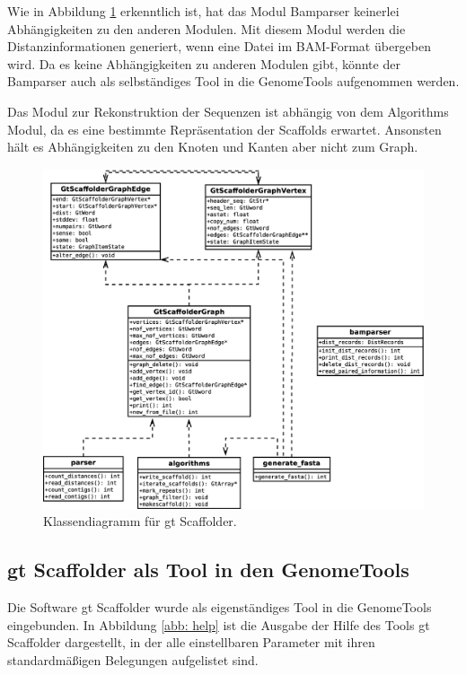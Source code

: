 \documentclass[a4paper,11pt,parskip,abstract=on]{scrartcl}
\begin{document}
Wie in Abbildung \ref{abb: UML} erkenntlich ist, hat das Modul
Bamparser keinerlei Abhängigkeiten zu den anderen Modulen. Mit diesem
Modul werden die Distanzinformationen generiert, wenn eine Datei im
BAM-Format übergeben wird. Da es keine Abhängigkeiten zu anderen
Modulen gibt, könnte der Bamparser auch als selbständiges Tool in die
GenomeTools aufgenommen werden.

Das Modul zur Rekonstruktion der Sequenzen ist abhängig von dem
Algorithms Modul, da es eine bestimmte Repräsentation der Scaffolds
erwartet. Ansonsten hält es Abhängigkeiten zu den Knoten und Kanten
aber nicht zum Graph.

\begin{figure}
  \centering
  \includegraphics[width=1\linewidth]{uml2.eps}
  \caption{Klassendiagramm für gt Scaffolder.}
\label{abb: UML}
\end{figure}

\subsection{gt Scaffolder als Tool in den GenomeTools}
Die Software gt Scaffolder wurde als eigenständiges Tool in die GenomeTools
eingebunden. In Abbildung \ref{abb: help} ist die Ausgabe der Hilfe des Tools
gt Scaffolder dargestellt, in der alle einstellbaren Parameter mit ihren
standardmäßigen Belegungen aufgelistet sind.
\end{document}
